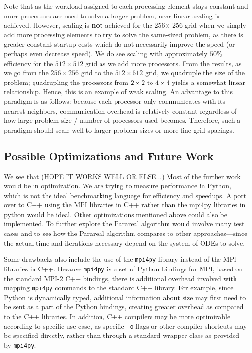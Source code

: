 \documentclass[letterpaper,12pt]{article}
\begin{document}
Note that as the workload assigned to each processing element stays constant and more processors are used to solve a larger problem, near-linear scaling is achieved. However, scaling is \textbf{not} achieved for the 256$\times$ 256 grid when we simply add more processing elements to try to solve the same-sized problem, as there is greater constant startup costs which do not necessarily improve the speed (or perhaps even decrease speed). We do see scaling with approximately $50\%$ efficiency for the $512\times 512$ grid as we add more processors. From the results, as we go from the $256\times256$ grid to the $512\times 512$ grid, we quadruple the size of the problem; quadrupling the processors from $2\times 2$ to $4\times4$ yields a somewhat linear relationship. Hence, this is an example of weak scaling. An advantage to this paradigm is as follows: because each processor only communicates with its nearest neighbors, communication overhead is relatively constant regardless of how large problem size / number of processors used becomes. Therefore, such a paradigm should scale well to larger problem sizes or more fine grid spacings. 

\subsection{Possible Optimizations and Future Work}

We see that (HOPE IT WORKS WELL OR ELSE...) Most of the further work would be in
optimization. We are trying to measure performance in Python, which is not the
ideal benchmarking language for efficiency and speedups. A port over to C++
using the MPI libraries in C++ rather than the mpi4py libraries in python would
be ideal. Other optimizations mentioned above could also be implemented. To
further explore the Parareal algorithm would involve many test cases and to see
how the Parareal algorithm compares to other approaches---since the actual time
and iterations necessary depend on the system of ODEs to solve.

Some drawbacks also include the use of the \verb|mpi4py| library instead of the MPI libraries in C++. Because \verb|mpi4py| is a set of Python bindings for MPI, based on the standard MPI-2 C++ bindings, there is additional overhead involved with mapping \verb|mpi4py| commands to the standard C++ library. For example, since Python is dynamically typed, additional information about size may first need to be sent as a part of the Python bindings, creating greater overhead as compared to the C++ libraries. In addition, C++ compilers may be more optimizable according to specific use case, as specific \verb|-o| flags or other compiler shortcuts may be specified directly, rather than through a standard wrapper class as provided by \verb|mpi4py|.
\end{document}
